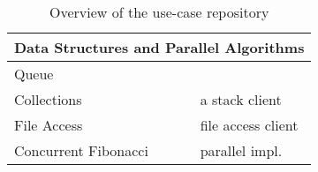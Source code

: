 \begin{table}
\begin{center}
\begin{tabular}{|l|l|l|l|}
	\hline
	\multicolumn{4}{|l|}{ \textbf{Data Structures and Parallel Algorithms}}
	\\
	\hline
	Queue & \cite{Queue} & \Sill &
	\\
	Collections & \cite{Stack} & \TypeState  & a stack client
	\\
	File Access & \cite{FileAccess} & \TypeState & file access client
	\\
	Concurrent Fibonacci & \TypeState & \Mungo & parallel impl.
	\\
	\hline
\end{tabular}
\end{center}
\caption{Overview of the use-case repository }
\label{table:use_cases_all}
\end{table}

